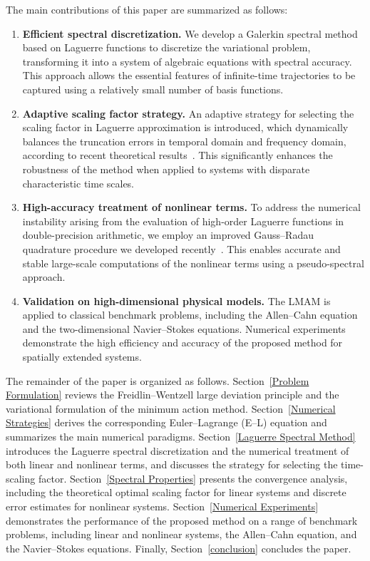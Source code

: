 \documentclass[a4paper,fleqn, 12pt]{cas-sc}
\numberwithin{table}{section}
\begin{document}
The main contributions of this paper are summarized as follows:
\begin{enumerate}
	\item \textbf{Efficient spectral discretization.}  
	We develop a Galerkin spectral method based on Laguerre functions to discretize the variational problem, transforming it into a system of algebraic equations with spectral accuracy. This approach allows the essential features of infinite-time trajectories to be captured using a relatively small number of basis functions.
	
	\item \textbf{Adaptive scaling factor strategy.}  
	An adaptive strategy for selecting the scaling factor in Laguerre approximation is introduced, which dynamically balances the truncation errors in temporal domain and frequency domain, according to recent theoretical results~\cite{hu2026scaling,huscaling}. This significantly enhances the robustness of the method when applied to systems with disparate characteristic time scales.
	
	\item \textbf{High-accuracy treatment of nonlinear terms.}  
	To address the numerical instability arising from the evaluation of high-order Laguerre functions in double-precision arithmetic, we employ an improved Gauss--Radau quadrature procedure we developed recently~\cite{huang2024improved}. This enables accurate and stable large-scale computations of the nonlinear terms using a pseudo-spectral approach.
	
	\item \textbf{Validation on high-dimensional physical models.}  
	The LMAM is applied to classical benchmark problems, including the Allen--Cahn equation and the two-dimensional Navier--Stokes equations. Numerical experiments demonstrate the high efficiency and accuracy of the proposed method for spatially extended systems.
\end{enumerate}

The remainder of the paper is organized as follows.
Section~\ref{Problem Formulation} reviews the Freidlin--Wentzell large deviation principle and the variational formulation of the minimum action method.
Section~\ref{Numerical Strategies} derives the corresponding Euler--Lagrange (E--L) equation and summarizes the main numerical paradigms.
Section~\ref{Laguerre Spectral Method} introduces the Laguerre spectral discretization and the numerical treatment of both linear and nonlinear terms, and discusses the strategy for selecting the time-scaling factor.
Section~\ref{Spectral Properties} presents the convergence analysis, including the theoretical optimal scaling factor for linear systems and discrete error estimates for nonlinear systems.
Section~\ref{Numerical Experiments} demonstrates the performance of the proposed method on a range of benchmark problems, including linear and nonlinear systems, the Allen--Cahn equation, and the Navier--Stokes equations.
Finally, Section~\ref{conclusion} concludes the paper.
\end{document}
